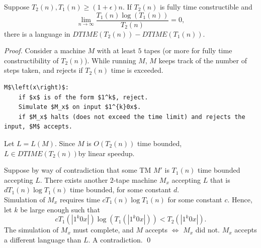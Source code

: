 \begin{theorem}
  Suppose $T_2(n),T_1(n)\ge \left( 1+\epsilon \right) {n}$. If $T_2(n)$ is
  fully time constructible and
  \[\lim_{n \to \infty} \frac{T_1(n)\log{\left( T_1\left( n \right)  \right) }}{T_2(n)}=0,\] 
  there is a language in $DTIME\left( T_2\left( n \right)  \right) -DTIME\left(
  T_1\left( n \right)  \right) $.
\end{theorem}
\begin{proof}
  Consider a machine $M$ with at least $5$ tapes (or more for fully time
  constructibility of $T_2\left( n \right) $). While running $M$, $M$ keeps
  track of the number of steps taken, and rejects if $T_2(n)$ time is exceeded.
  \begin{lstlisting}[mathescape]
  M$\left(x\right)$:
    if $x$ is of the form $1^k$, reject.
    Simulate $M_x$ on input $1^{k}0x$.
    if $M_x$ halts (does not exceed the time limit) and rejects the input, $M$ accepts.
  \end{lstlisting}
  Let $L=L(M)$. Since $M$ is $O(T_2(n))$ time bounded, $L \in DTIME\left(
  T_2(n) \right) $by linear speedup.

  Suppose by way of contradiction that some TM $M'$ is $T_1(n)$ time bounded
  accepting $L$. There exists another $2$-tape machine $M_x$ accepting $L$
  that is $dT_1(n)\log{T_1(n)}$ time bounded, for some constant $d$.\\

  Simulation of $M_x$ requires time $cT_1(n)\log{T_1(n)}$ for some constant
  $c$. Hence, let $k$ be large enough such that
  \[cT_1\left( \left| 1^{k}0x \right|  \right)\log{\left( T_1\left( \left|
  1^{k}0x \right|  \right)  \right) } <T_2\left( \left| 1^{k}0x \right|
\right).\]
  The simulation of $M_x$ must complete, and $M$ accepts $\iff$ $M_x$ did not.
  $M_x$ accepts a different language than $L$. A contradiction. \qed
\end{proof}
